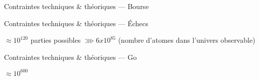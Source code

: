 \begin{frame}{Contraintes techniques \& théoriques --- Bourse}
\end{frame}

\begin{frame}{Contraintes techniques \& théoriques --- Échecs}
  \pause
  \begin{center}
    $\approx 10^{120}$ parties possibles $\ggg 6 x 10^{85}$
    \newline
    (nombre d'atomes dans l'univers observable)
  \end{center}
\end{frame}

\begin{frame}{Contraintes techniques \& théoriques --- Go}
  \begin{center}
    \huge{$\approx 10^{600}$}
  \end{center}
\end{frame}

